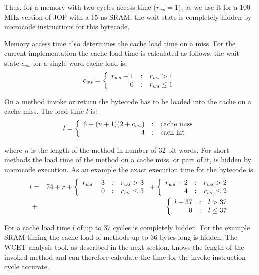 Thus, for a memory with two cycles access time ($r_{ws}=1)$, as we
use it for a 100 MHz version of JOP with a 15 ns SRAM, the wait
state is completely hidden by microcode instructions for this
bytecode.

Memory access time also determines the cache load time on a miss.
For the current implementation the cache load time is calculated as
follows: the wait state $c_{ws}$ for a single word cache load is:
%
{\small
\begin{equation*}
    c_{ws} =
    \left\{\begin{array}{r@{\quad:\quad}l}
    r_{ws}-1 & r_{ws}>1 \\
    0   & r_{ws}\le1
    \end{array} \right.
\end{equation*}
}

On a method invoke or return the bytecode has to be loaded into the
cache on a cache miss. The load time $l$ is:
%
{\small
\[
    l =
    \left\{\begin{array}{r@{\quad:\quad}l}
    6+(n+1)(2+c_{ws}) & \mbox{cache miss} \\
    4   & \mbox{cach hit}
    \end{array} \right.
\]
}

where $n$ is the length of the method in number of 32-bit words. For
short methods the load time of the method on a cache miss, or part
of it, is hidden by microcode execution. As an example the exact
execution time for the bytecode  is:
%
{\small
\begin{eqnarray}
\nonumber
    t &=& 74+r+
    \left\{\begin{array}{r@{\quad:\quad}l}
    r_{ws}-3 & r_{ws}>3 \\
    0   & r_{ws}\le3
    \end{array} \right.
    +
    \left\{\begin{array}{r@{\quad:\quad}l}
    r_{ws}-2 & r_{ws}>2 \\
    4   & r_{ws}\le2
    \end{array} \right.\\
\nonumber
    &+&
    \left\{\begin{array}{r@{\quad:\quad}l}
    l-37 & l>37 \\
    0   & l\le37
    \end{array} \right.
\end{eqnarray}
}

For  a cache load time $l$ of up to 37 cycles is
completely hidden. For the example SRAM timing the cache load of
methods up to 36 bytes long is hidden. The WCET analysis tool, as
described in the next section, knows the length of the invoked
method and can therefore calculate the time for the invoke
instruction cycle accurate.




